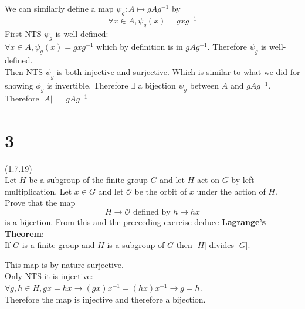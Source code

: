 \documentclass{article}
\begin{document}
\begin{addmargin}[1em]{0em}
    We can similarly define a map $\psi_g: A \mapsto gAg^{-1}$ by
    \begin{equation*}
        \forall x \in A, \psi_g(x) = gxg^{-1}
    \end{equation*}
    First NTS $\psi_g$ is well defined:\\
    $\forall x \in A, \psi_g(x) = gxg^{-1}$ which by definition is in $gAg^{-1}$. Therefore $\psi_g$ is well-defined.\\
    Then NTS $\psi_g$ is both injective and surjective. Which is similar to what we did for showing $\phi_g$ is invertible. Therefore $\exists$ a bijection $\psi_g$ between $A$ and $gAg^{-1}$.\\
    Therefore $|A| = |gAg^{-1}|$
\end{addmargin}
\section*{3}
(1.7.19)\\
Let $H$ be a subgroup of the finite group $G$ and let $H$ act on $G$ by left multiplication. Let $x \in G$ and let $\mathcal{O}$ be the orbit of $x$ under the action of $H$. Prove that the map
\begin{equation*}
    H \rightarrow \mathcal{O} \textrm{  defined by } h \mapsto hx
\end{equation*}
is a bijection. From this and the preceeding exercise deduce \textbf{Lagrange's Theorem}:\\
If $G$ is a finite group and $H$ is a subgroup of $G$ then $|H|$ divides $|G|$.
\begin{addmargin}[1em]{0em}
    This map is by nature surjective.\\
    Only NTS it is injective:\\
    $\forall g, h \in H, gx = hx \rightarrow (gx)x^{-1} = (hx)x^{-1} \rightarrow g = h$.\\
    Therefore the map is injective and therefore a bijection.
\end{addmargin}
\end{document}
